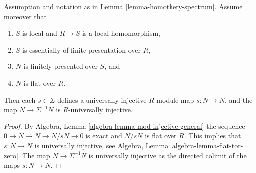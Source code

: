 \begin{lemma}
\label{lemma-homothety-universally-injective}
Assumption and notation as in
Lemma \ref{lemma-homothety-spectrum}.
Assume moreover that
\begin{enumerate}
\item $S$ is local and $R \to S$ is a local homomorphism,
\item $S$ is essentially of finite presentation over $R$,
\item $N$ is finitely presented over $S$, and
\item $N$ is flat over $R$.
\end{enumerate}
Then each $s \in \Sigma$ defines a
universally injective $R$-module map $s : N \to N$, and the
map $N \to \Sigma^{-1}N$ is $R$-universally injective.
\end{lemma}

\begin{proof}
By
Algebra, Lemma \ref{algebra-lemma-mod-injective-general}
the sequence $0 \to N \to N \to N/sN \to 0$ is exact and
$N/sN$ is flat over $R$. This implies that $s : N \to N$
is universally injective, see
Algebra, Lemma \ref{algebra-lemma-flat-tor-zero}.
The map $N \to \Sigma^{-1}N$ is universally injective as the directed
colimit of the maps $s : N \to N$.
\end{proof}
